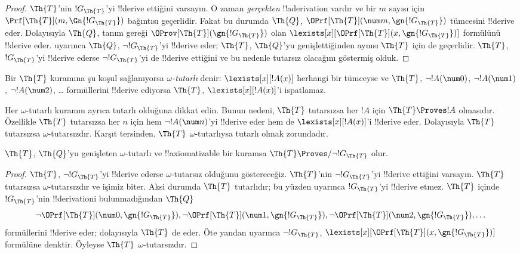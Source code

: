 \documentclass[../../../include/open-logic-section]{subfiles}
\begin{document}
\begin{proof}
$\Th{T}$'nin $!G_\Th{T}$'yi !!{derive} ettiğini varsayın. O zaman \emph{gerçekten}
!!a{derivation} vardır ve bir $m$ sayısı için
$\Prf[\Th{T}](m,\Gn{!G_\Th{T}})$ bağıntısı geçerlidir. Fakat bu durumda
$\Th{Q}$, $\OPrf[\Th{T}](\num m,\gn{!G_\Th{T}})$ tümcesini !!{derive} eder.
Dolayısıyla $\Th{Q}$, tanım gereği $\OProv[\Th{T}](\gn{!G_\Th{T}})$ olan
$\lexists[x][\OPrf[\Th{T}](x,\gn{!G_\Th{T}})]$ formülünü !!{derive} eder.
 uyarınca $\Th{Q}$, $\lnot !G_\Th{T}$'yi !!{derive} eder;
$\Th{T}$, $\Th{Q}$'yu genişlettiğinden aynısı $\Th{T}$ için de geçerlidir.
$\Th{T}$, $!G_\Th{T}$'yi !!{derive} ederse $\lnot !G_\Th{T}$'yi de
!!{derive} ettiğini ve bu nedenle tutarsız olacağını göstermiş olduk.
\end{proof}

\begin{defn}
Bir $\Th{T}$ kuramına şu koşul sağlanıyorsa \emph{$\omega$-tutarlı} denir:
$\lexists[x][!A(x)]$ herhangi bir tümceyse ve $\Th{T}$,
$\lnot !A(\num 0)$, $\lnot !A(\num 1)$, $\lnot !A(\num 2)$, \dots
formüllerini !!{derive} ediyorsa $\Th{T}$, $\lexists[x][!A(x)]$'i ispatlamaz.
\end{defn}

Her $\omega$-tutarlı kuramın ayrıca tutarlı olduğuna dikkat edin. Bunun nedeni,
$\Th{T}$ tutarsızsa her $!A$ için $\Th{T} \Proves !A$ olmasıdır. Özellikle
$\Th{T}$ tutarsızsa her $n$ için hem $\lnot !A(\num n)$'yi !!{derive} eder
hem de $\lexists[x][!A(x)]$'i !!{derive} eder. Dolayısıyla $\Th{T}$ tutarsızsa
$\omega$-tutarsızdır. Karşıt tersinden, $\Th{T}$ $\omega$-tutarlıysa tutarlı
olmak zorundadır.

\begin{lem}
$\Th{T}$, $\Th{Q}$'yu genişleten $\omega$-tutarlı ve !!{axiomatizable} bir
kuramsa $\Th{T} \Proves/ \lnot !G_\Th{T}$ olur.
\end{lem}

\begin{proof}
$\Th{T}$, $\lnot !G_\Th{T}$'yi !!{derive} ederse $\omega$-tutarsız olduğunu
göstereceğiz. $\Th{T}$'nin $\lnot !G_\Th{T}$'yi !!{derive} ettiğini varsayın.
$\Th{T}$ tutarsızsa $\omega$-tutarsızdır ve işimiz biter. Aksi durumda
$\Th{T}$ tutarlıdır; bu yüzden  uyarınca
$!G_\Th{T}$'yi !!{derive} etmez. $\Th{T}$ içinde $!G_\Th{T}$'nin
!!{derivation}{}i bulunmadığından $\Th{Q}$
\[
\lnot \OPrf[\Th{T}](\num 0, \gn{!G_\Th{T}}), \lnot \OPrf[\Th{T}](\num 1,
\gn{!G_\Th{T}}), \lnot \OPrf[\Th{T}](\num 2, \gn{!G_\Th{T}}), \dots
\]
formüllerini !!{derive} eder; dolayısıyla $\Th{T}$ de eder. Öte yandan
 uyarınca $\lnot !G_\Th{T}$,
$\lexists[x][\OPrf[\Th{T}](x,\gn{!G_\Th{T}})]$ formülüne denktir. Öyleyse
$\Th{T}$ $\omega$-tutarsızdır.
\end{proof}
\end{document}
